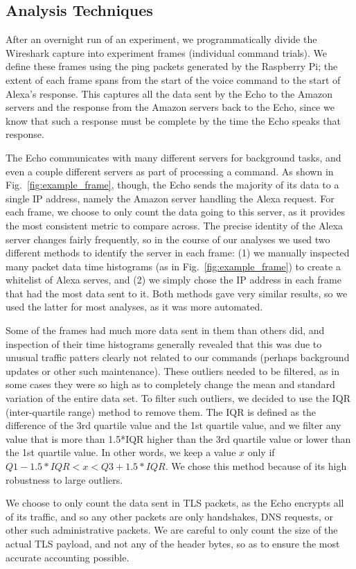 \subsection{Analysis Techniques}

After an overnight run of an experiment, we programmatically divide the Wireshark capture into experiment frames (individual command trials). We define these frames using the ping packets generated by the Raspberry Pi; the extent of each frame spans from the start of the voice command to the start of Alexa's response. This captures all the data sent by the Echo to the Amazon servers and the response from the Amazon servers back to the Echo, since we know that such a response must be complete by the time the Echo speaks that response.

The Echo communicates with many different servers for background tasks, and even a couple different servers as part of processing a command. As shown in Fig.~\ref{fig:example_frame}, though, the Echo sends the majority of its data to a single IP address, namely the Amazon server handling the Alexa request. For each frame, we choose to only count the data going to this server, as it provides the most consistent metric to compare across. The precise identity of the Alexa server changes fairly frequently, so in the course of our analyses we used two different methods to identify the server in each frame: (1) we manually inspected many packet data time histograms (as in Fig.~\ref{fig:example_frame}) to create a whitelist of Alexa serves, and (2) we simply chose the IP address in each frame that had the most data sent to it. Both methods gave very similar results, so we used the latter for most analyses, as it was more automated.

Some of the frames had much more data sent in them than others did, and inspection of their time histograms generally revealed that this was due to unusual traffic patters clearly not related to our commands (perhaps background updates or other such maintenance). These outliers needed to be filtered, as in some cases they were so high as to completely change the mean and standard variation of the entire data set. To filter such outliers, we decided to use the IQR (inter-quartile range) method to remove them. The IQR is defined as the difference of the 3rd quartile value and the 1st quartile value, and we filter any value that is more than 1.5*IQR higher than the 3rd quartile value or lower than the 1st quartile value. In other words, we keep a value $x$ only if $Q1 - 1.5*IQR < x < Q3 + 1.5*IQR$. We chose this method because of its high robustness to large outliers.

We choose to only count the data sent in TLS packets, as the Echo encrypts all of its traffic, and so any other packets are only handshakes, DNS requests, or other such administrative packets. We are careful to only count the size of the actual TLS payload, and not any of the header bytes, so as to ensure the most accurate accounting possible.



